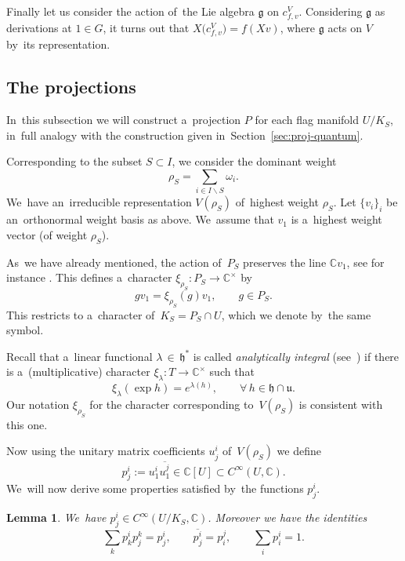 \documentclass[pdftex]{sigma}
\numberwithin{equation}{section}
\newtheorem{Lemma}[Theorem]{Lemma}
\newcommand{\lieg}{\mathfrak{g}}
\newcommand{\lieh}{\mathfrak{h}}
\newcommand{\lieu}{\mathfrak{u}}
\newcommand{\CU}{\mathbb{C}[U]}
\newcommand{\bbC}{\mathbb{C}}
\newcommand{\weiS}{\rho_S}
\newcommand{\charS}{\xi_{\weiS}}
\begin{document}
Finally let us consider the action of~the Lie algebra $\lieg$ on $c^V_{f, v}$.
Considering $\lieg$ as derivations at $1 \in G$, it turns out that $X\big(c^V_{f, v}\big) = f(X v)$, where $\lieg$ acts on $V$ by~its representation.

\subsection{The projections}

In~this subsection we will construct a~projection $P$ for each flag manifold $U / K_S$, in~full analogy with the construction given in~Section~\ref{sec:proj-quantum}.

Corresponding to the subset $S \subset I$, we consider the dominant weight
\[
\rho_S = \sum_{i \in I \backslash S} \omega_i.
\]
We~have an~irreducible representation $V(\rho_S)$ of~highest weight $\rho_S$.
Let $\{v_i\}_i$ be an~orthonormal weight basis as above.
We~assume that $v_1$ is a~highest weight vector (of weight $\rho_S$).

As~we have already mentioned, the action of~$P_S$ preserves the line $\bbC v_1$, see for instance \mbox{\cite[Section~3.2.8]{cap-book}}.
This defines a~character $\charS\colon P_S \to \bbC^\times$ by
\[
g v_1 = \charS(g) v_1, \qquad g \in P_S.
\]
This restricts to a~character of~$K_S = P_S \cap U$, which we denote by~the same symbol.

\begin{Remark}
Recall that a~linear functional $\lambda\, {\in}\, \lieh^*$ is called \emph{analytically integral} (see~\cite[Sec\-tion~IV.7]{knapp}) if there is a~(multiplicative) character $\xi_\lambda\colon T \to \bbC^\times$ such that
\[
\xi_\lambda(\exp h) = e^{\lambda(h)}, \qquad \forall\, h \in \lieh \cap \lieu.
\]
Our notation $\charS$ for the character corresponding to~$V(\rho_S)$ is consistent with this one.
\end{Remark}

Now using the unitary matrix coefficients $u^i_j$ of~$V(\rho_S)$ we define
\begin{equation}
\label{eq:class-proj}
p^i_j := u^i_1 \overline{u^j_1} \in \CU \subset C^\infty(U, \bbC).
\end{equation}
We~will now derive some properties satisfied by~the functions $p^i_j$.

\begin{Lemma}
\label{lem:proj-mat}
We~have $p^i_j \in C^\infty(U / K_S, \bbC)$. Moreover we have the identities
\[
\sum_k p^i_k p^k_j = p^i_j, \qquad
\overline{p^i_j} = p^j_i, \qquad
\sum_i p^i_i = 1.
\]
\end{Lemma}
\end{document}
